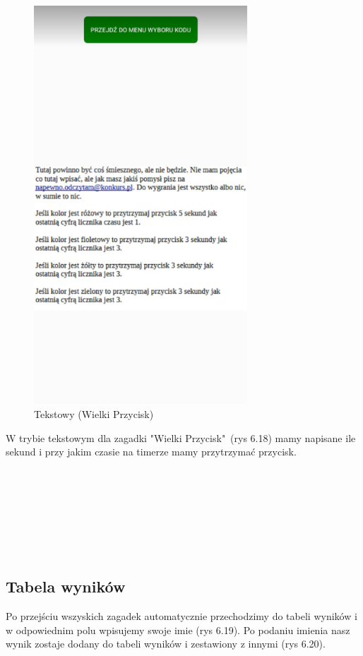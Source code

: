 	\begin{figure}[!htb]
	\begin{center}
		\includegraphics[width=8cm]{rys/tekstowy5.png}
		\caption{Tekstowy (Wielki Przycisk)}
		\label{rys:rysunek001}
	\end{center}
\end{figure}
\hspace{-0.60cm}W trybie tekstowym dla zagadki "Wielki Przycisk"~(rys 6.18) mamy napisane ile sekund i przy jakim czasie na timerze mamy przytrzymać przycisk.
\\
\\
\\
\\
\\
\\
\\
\\
\subsection{Tabela wyników}
Po przejściu wszyskich zagadek automatycznie przechodzimy do tabeli wyników i w odpowiednim polu wpisujemy swoje imie (rys 6.19). Po podaniu imienia nasz wynik zostaje dodany do tabeli wyników i zestawiony z innymi (rys 6.20).

